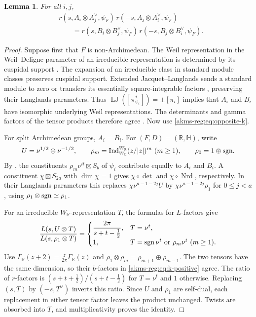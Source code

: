 \documentclass[11pt,reqno]{amsart}
\theoremstyle{plain}
\newtheorem{lem}[thm]{Lemma}
\theoremstyle{definition}
\newcommand{\C}{\mathbb{C}}
\newcommand{\R}{\mathbb{R}}
\newcommand{\sgn}{\tu{sgn}}
\newcommand{\tu}{\textup}
\numberwithin{equation}{subsection}
\begin{document}
\begin{lem}\label{akms-reg:lem:exact-comparison}
For all $i,j$,
\begin{equation}\label{akms-reg:eq:opposite-comparison}
\begin{aligned}
 &r(s,A_i\otimes A_j^\vee,\psi_F)\,
  r(-s,A_j\otimes A_i^\vee,\psi_F)\\
 &\qquad =
  r(s,B_i\otimes B_j^\vee,\psi_F)\,
  r(-s,B_j\otimes B_i^\vee,\psi_F).
\end{aligned}
\end{equation}
\end{lem}
\begin{proof}
Suppose first that $F$ is non-Archimedean. The Weil representation
in the Weil--Deligne parameter of an irreducible representation is
determined by its cuspidal support \cite[Prop.~4.3]{regCohen}.
The expansion of an irreducible class in standard module classes
preserves cuspidal support. Extended Jacquet--Langlands sends a
standard module to zero or transfers its essentially square-integrable
factors \cite[\S4.1]{regCohen}, preserving their Langlands parameters.
Thus $\operatorname{LJ}([\pi_{\psi_i}^*])=\pm[\pi_i]$ implies that
$A_i$ and $B_i$ have isomorphic underlying Weil representations.
The determinants and gamma factors of the tensor products therefore
agree \cite[Cor.~4.5(1)]{HM17}. Now use \eqref{akms-reg:eq:opposite-k}.

For split Archimedean groups, $A_i=B_i$. For $(F,D)=(\R,\mathbb H)$,
write
\[
 U=\nu^{1/2}\oplus\nu^{-1/2},\qquad
 \rho_m=\operatorname{Ind}_{W_\C}^{W_\R}(z/|z|)^m\ (m\geq1),
 \qquad \rho_0=1\oplus\sgn .
\]
By \cite[\S11.3, Cor.~13.7, Thm.~13.8]{BadRen}, the constituents
$\rho_m\nu^{it}\boxtimes S_b$ of $\psi_i$ contribute equally to
$A_i$ and $B_i$. A constituent $\chi\boxtimes S_{2a}$ with
$\dim\chi=1$ gives $\chi\circ\det$ and $\chi\circ\operatorname{Nrd}$,
respectively. In their Langlands parameters this replaces
$\chi\nu^{a-1-2j}U$ by $\chi\nu^{a-1-2j}\rho_1$ for
$0\leq j<a$, using $\rho_1\otimes\sgn\simeq\rho_1$.

For an irreducible $W_\R$-representation $T$, the formulas for
$L$-factors \cite[(3.2.4)--(3.2.5)]{Tat79} give
\[
 \frac{L(s,U\otimes T)}{L(s,\rho_1\otimes T)}
 =
 \begin{cases}
  \dfrac{2\pi}{s+t-\tfrac12}, & T=\nu^t,\\[3pt]
  1, & T=\sgn\,\nu^t\text{ or }\rho_m\nu^t\ (m\geq1).
 \end{cases}
\]
Use $\Gamma_\R(z+2)=\frac{z}{2\pi}\Gamma_\R(z)$ and
$\rho_1\otimes\rho_m=\rho_{m+1}\oplus\rho_{m-1}$.
The two tensors have the same dimension, so their $b$-factors
in \eqref{akms-reg:eq:k-positive} agree. The ratio of $r$-factors
is $(s+t+\tfrac12)/(s+t-\tfrac12)$ for $T=\nu^t$ and $1$ otherwise.
Replacing $(s,T)$ by $(-s,T^\vee)$ inverts this ratio. Since
$U$ and $\rho_1$ are self-dual, each replacement in
either tensor factor leaves the product unchanged. Twists are
absorbed into $T$, and multiplicativity proves the identity.
\end{proof}
\end{document}
